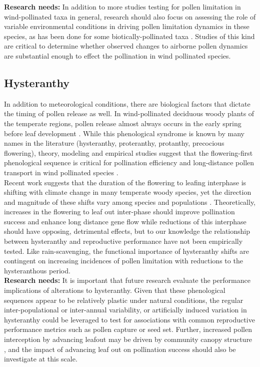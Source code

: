 \documentclass[11pt]{article}
\begin{document}
\noindent \textbf{Research needs:} In addition to more studies testing for pollen limitation in wind-pollinated taxa in general, research should also focus on assessing the role of variable environmental conditions in driving pollen limitation dynamics in these species, as has been done for some biotically-pollinated taxa \citep{Totland:1999aa}. Studies of this kind are critical to determine whether observed changes to airborne pollen dynamics are substantial enough to effect the pollination in wind pollinated species.\\

\subsection*{Hysteranthy}
\noindent In addition to meteorological conditions, there are biological factors that dictate the timing of pollen release as well. In wind-pollinated deciduous woody plants of the temperate regions, pollen release almost always occurs in the early spring before leaf development \citep{Whitehead1969}. While this phenological syndrome is known by many names in the literature (hysteranthy, proteranthy, protanthy, precocious flowering)\citep{Buonaiuto2020}, theory, modeling and empirical studies suggest that the flowering-first phenological sequence is critical for pollination efficiency and long-distance pollen transport in wind pollinated species \citep{Tauber1967,Nathan2005,Milleron2012}.\\

\noindent Recent work suggests that the duration of the flowering to leafing interphase is shifting with climate change in many temperate woody species, yet the direction and magnitude of these shifts vary among species and populations \citep{Buonaiuto2020,Buonaiuto2020b}. Theoretically, increases in the flowering to leaf out inter-phase should improve pollination success and enhance long distance gene flow while reductions of this interphase should have opposing, detrimental effects, but to our knowledge the relationship between hysteranthy and reproductive performance have not been empirically tested. Like rain-scavenging, the functional importance of hysteranthy shifts are contingent on increasing incidences of pollen limitation with reductions to the hysteranthous period. \\

\textbf{Research needs:} It is important that future research evaluate the performance implications of alterations to hysteranthy. Given that these phenological sequences appear to be relatively plastic under natural conditions, the regular inter-populational or inter-annual variability, or artificially induced variation in hysteranthy could be leveraged to test for associations with common reproductive performance metrics such as pollen capture or seed set. Further, increased pollen interception by advancing leafout may be driven by community canopy structure \citep{Khanduri:2019aa}, and the impact of advancing leaf out on pollination success should also be investigate at this scale.\\ 
\end{document}
